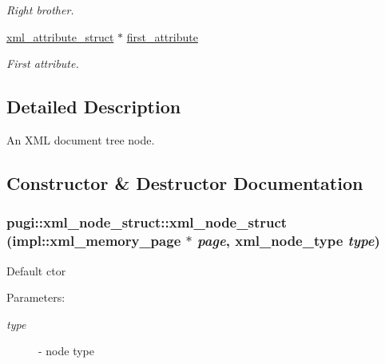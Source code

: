 \begin{CompactItemize}
\begin{CompactList}\small\item\em Right brother. \item\end{CompactList}\item 
\hyperlink{structpugi_1_1xml__attribute__struct}{xml\_\-attribute\_\-struct} $\ast$ \hyperlink{structpugi_1_1xml__node__struct_482d2daf97ce0745661cb2c57d8f6fb3}{first\_\-attribute}
\begin{CompactList}\small\item\em First attribute. \item\end{CompactList}\end{CompactItemize}


\subsection{Detailed Description}
An XML document tree node. 



\subsection{Constructor \& Destructor Documentation}
\hypertarget{structpugi_1_1xml__node__struct_f9af20f835af8b6b99f9a39c93920ea6}{
\subsubsection[xml\_\-node\_\-struct]{\setlength{\rightskip}{0pt plus 5cm}pugi::xml\_\-node\_\-struct::xml\_\-node\_\-struct (impl::xml\_\-memory\_\-page $\ast$ {\em page}, xml\_\-node\_\-type {\em type})}}
\label{structpugi_1_1xml__node__struct_f9af20f835af8b6b99f9a39c93920ea6}


Default ctor \begin{Desc}
\item[Parameters:]
\begin{description}
\item[{\em type}]- node type \end{description}
\end{Desc}


